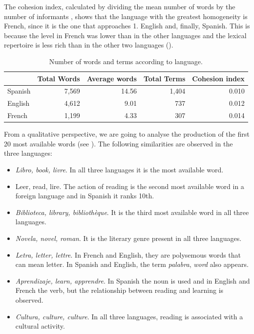 \documentclass[english]{textolivre}
\begin{document}
The cohesion index, calculated by dividing the mean number of words by the number of informants \cite{mena_disponibilidad_1986}, shows that the language with the greatest homogeneity is French, since it is the one that approaches 1. English and, finally, Spanish. This is because the level in French was lower than in the other languages and the lexical repertoire is less rich than in the other two languages ().

\begin{table}[h!]
\centering
\begin{threeparttable}
\caption{Number of words and terms according to language.}
\label{tab01}
\begin{tabular}{l r r r r}
\toprule
 & Total Words & Average words & Total Terms & Cohesion index  \\
 \midrule
Spanish & 7,569 & 14.56 & 1,404 & 0.010   \\
English & 4,612 & 9.01 & 737 & 0.012  \\
French & 1,199 & 4.33 & 307 & 0.014 \\
\bottomrule
\end{tabular}
\end{threeparttable}
\end{table}

From a qualitative perspective, we are going to analyse the production of the first 20 most available words (see ). The following similarities are observed in the three languages:

\begin{itemize}
    \item \textit{Libro, book, livre}. In all three languages it is the most available word.
    \item Leer, read, lire. The action of reading is the second most available word in a foreign language and in Spanish it ranks 10th.
    \item \textit{Biblioteca, library, bibliothèque}. It is the third most available word in all three languages.
    \item \textit{Novela, novel, roman}. It is the literary genre present in all three languages.
    \item \textit{Letra, letter, lettre}. In French and English, they are polysemous words that can mean letter. In Spanish and English, the term \textit{palabra}, \textit{word} also appears.
    \item \textit{Aprendizaje, learn, apprendre}. In Spanish the noun is used and in English and French the verb, but the relationship between reading and learning is observed.
    \item \textit{Cultura, culture, culture}. In all three languages, reading is associated with a cultural activity.
\end{itemize}
\end{document}
